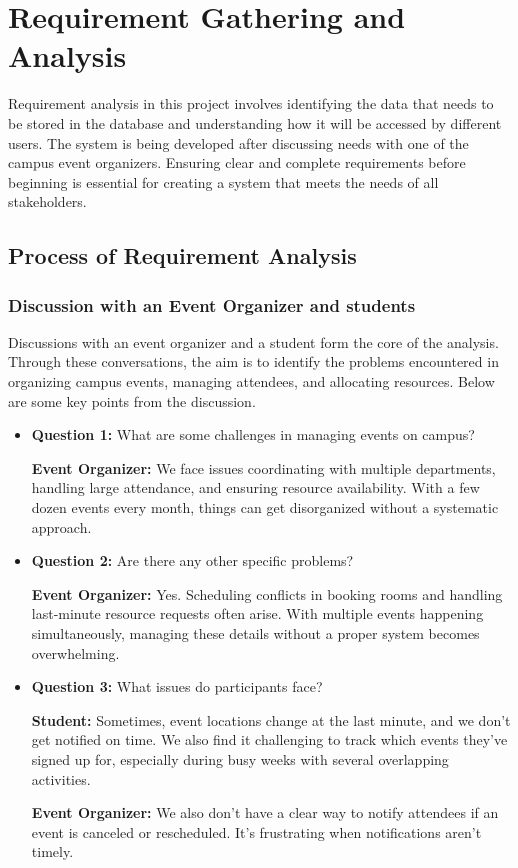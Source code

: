 \section{Requirement Gathering and Analysis}

Requirement analysis in this project involves identifying the data that needs to be stored in the database and understanding how it will be accessed by different users. The system is being developed after discussing needs with one of the campus event organizers. Ensuring clear and complete requirements before beginning is essential for creating a system that meets the needs of all stakeholders.

\subsection{Process of Requirement Analysis}

\subsubsection{Discussion with an Event Organizer and students}

Discussions with an event organizer and a student form the core of the analysis. Through these conversations, the aim is to identify the problems encountered in organizing campus events, managing attendees, and allocating resources. Below are some key points from the discussion.

\begin{itemize}
    \item \textbf{Question 1:} What are some challenges in managing events on campus?
    
    \textbf{Event Organizer:} We face issues coordinating with multiple departments, handling large attendance, and ensuring resource availability. With a few dozen events every month, things can get disorganized without a systematic approach.
    
    \item \textbf{Question 2:} Are there any other specific problems?
    
    \textbf{Event Organizer:} Yes. Scheduling conflicts in booking rooms and handling last-minute resource requests often arise.
    With multiple events happening simultaneously, managing these details without a proper system becomes overwhelming.
    
    \item \textbf{Question 3:} What issues do participants face?

    \textbf{Student:} Sometimes, event locations change at the last minute, and we don't get notified on time. We also find it challenging to track which events they've signed up for, especially during busy weeks with several overlapping activities.

    \textbf{Event Organizer:} We also don't have a clear way to notify attendees if an event is canceled or rescheduled. It's frustrating when notifications aren't timely.
\end{itemize}

